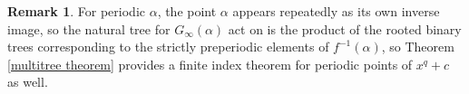 \documentclass[11pt]{amsart}
\theoremstyle{definition}
\theoremstyle{definition}
\newtheorem{rem}[thm]{Remark}
\numberwithin{thm}{section}
\numberwithin{equation}{thm}
\begin{document}
\begin{rem}\label{per}
  For periodic $\alpha$, the point $\alpha$ appears repeatedly as its
  own inverse image, so the natural tree for $G_\infty(\alpha)$ act on
  is the product of the rooted binary trees corresponding to the
  strictly preperiodic elements of $f^{-1}(\alpha)$, so Theorem
  \ref{multitree theorem} provides a finite index theorem for periodic
  points of $x^q + c$ as well.   
\end{rem}





%
%

\newcommand{\etalchar}[1]{$^{#1}$}
\providecommand{\bysame}{\leavevmode\hbox to3em{\hrulefill}\thinspace}
\providecommand{\MR}{\relax\ifhmode\unskip\space\fi MR }
\providecommand{\MRhref}[2]{%
  \href{http://www.ams.org/mathscinet-getitem?mr=#1}{#2}
}
\providecommand{\href}[2]{#2}
\end{document}
